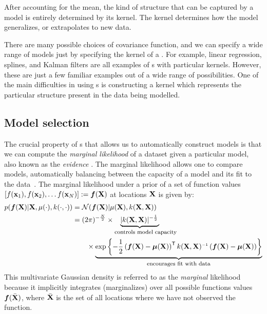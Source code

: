 After accounting for the mean, the kind of structure that can be captured by a \gp{} model is entirely determined by its kernel.
The kernel determines how the model generalizes, or extrapolates to new data.

There are many possible choices of covariance function, and we can specify a wide range of models just by specifying the kernel of a \gp{}.
For example, linear regression, splines, and Kalman filters are all examples of \gp{}s with particular kernels.
However, these are just a few familiar examples out of a wide range of possibilities. %
One of the main difficulties in using \gp{}s is constructing a kernel which represents the particular structure present in the data being modelled.


\subsection{Model selection}

The crucial property of \gp{}s that allows us to automatically construct models is that we can compute the \emph{marginal likelihood} of a dataset given a particular model, also known as the \emph{evidence} \citep{mackay1992bayesian}.
The marginal likelihood allows one to compare models, automatically balancing between the capacity of a model and its fit to the data~\citep{rasmussen2001occam,mackay2003information}.
%
%
The marginal likelihood under a \gp{} prior of a set of function values $\left[ f({\bf{x}}_1), f({\bf{x}}_2), \ldots f({\bf{x}}_N)  \right] \mathrel{:\mkern-0.25mu=} \boldsymbol{f}(\mathbf{X})$ at locations $\mathbf{X}$ is given by:
%
\begin{align}
p(\funcval | \vX, \mu(\cdot), k(\cdot, \cdot)) & = \N{\funcval}{\mu(\vX)}{k(\vX, \vX)} \label{eq:gp_marg_lik} \\
& = (2\pi)^{-\frac{N}{2}} \times \underwrite{ |k(\vX, \vX)|^{-\frac{1}{2}}\,}{\parbox{2.5cm}{\parbox{4cm}{\footnotesize controls model capacity}}} \nonumber \\
 & \qquad \times \underwrite{\exp \left\{ -\frac{1}{2} \left( \funcval - \boldsymbol\mu(\vX) \right)\tra k(\vX, \vX)\inv \left(\funcval - \boldsymbol\mu(\vX) \right) \right\}}{\footnotesize encourages fit with data} \nonumber
\end{align}
%
This multivariate Gaussian density is referred to as the \emph{marginal} likelihood because it implicitly integrates (marginalizes) over all possible functions values $\boldsymbol{f}( \bar {\mathbf{X}})$, where $\bar {\mathbf{X}}$ is the set of all locations where we have not observed the function.

